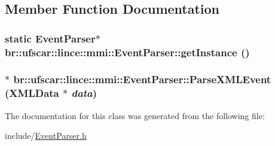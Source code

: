 \subsection{Member Function Documentation}
\hypertarget{classbr_1_1ufscar_1_1lince_1_1mmi_1_1EventParser_a83a5e79fec5383e011c86a04cc1be477}{
\subsubsection[{getInstance}]{\setlength{\rightskip}{0pt plus 5cm}static {\bf EventParser}$\ast$ br::ufscar::lince::mmi::EventParser::getInstance ()}}
\label{classbr_1_1ufscar_1_1lince_1_1mmi_1_1EventParser_a83a5e79fec5383e011c86a04cc1be477}
\hypertarget{classbr_1_1ufscar_1_1lince_1_1mmi_1_1EventParser_a1af73dd394ee69726f59893cf44fd6cb}{
\subsubsection[{ParseXMLEvent}]{$\ast$ br::ufscar::lince::mmi::EventParser::ParseXMLEvent ({\bf XMLData} $\ast$ {\em data})}}
\label{classbr_1_1ufscar_1_1lince_1_1mmi_1_1EventParser_a1af73dd394ee69726f59893cf44fd6cb}


The documentation for this class was generated from the following file:\begin{DoxyCompactItemize}
\item 
include/\hyperlink{EventParser_8h}{EventParser.h}\end{DoxyCompactItemize}
